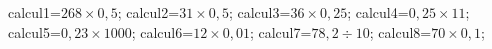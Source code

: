 \documentclass[exercice]{thedocument}%
\begin{document}
%
\>calcul1=$268\times0,5$;%
\>calcul2=$31\times0,5$;%
\>calcul3=$36\times0,25$;%
\>calcul4=$0,25\times11$;%
\>calcul5=$0,23\times1000$;%
\>calcul6=$12\times0,01$;%
\>calcul7=$78,2\div10$;%
\>calcul8=$70\times0,1$;%
%
\end{document}
